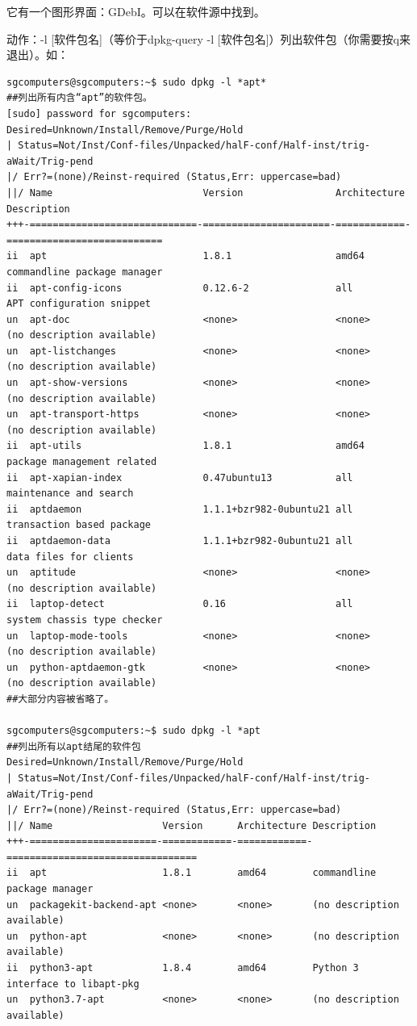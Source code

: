 \documentclass{book}
\begin{document}
它有一个图形界面：GDebI。可以在软件源中找到。\par
动作：-l [软件包名]（等价于dpkg-query -l [软件包名]）列出软件包（你需要按q来退出）。如：
\begin{verbatim}
sgcomputers@sgcomputers:~$ sudo dpkg -l *apt*
##列出所有内含“apt”的软件包。
[sudo] password for sgcomputers: 
Desired=Unknown/Install/Remove/Purge/Hold
| Status=Not/Inst/Conf-files/Unpacked/halF-conf/Half-inst/trig-aWait/Trig-pend
|/ Err?=(none)/Reinst-required (Status,Err: uppercase=bad)
||/ Name                          Version                Architecture Description
+++-=============================-======================-============-===========================
ii  apt                           1.8.1                  amd64        commandline package manager
ii  apt-config-icons              0.12.6-2               all          APT configuration snippet 
un  apt-doc                       <none>                 <none>       (no description available)
un  apt-listchanges               <none>                 <none>       (no description available)
un  apt-show-versions             <none>                 <none>       (no description available)
un  apt-transport-https           <none>                 <none>       (no description available)
ii  apt-utils                     1.8.1                  amd64        package management related 
ii  apt-xapian-index              0.47ubuntu13           all          maintenance and search 
ii  aptdaemon                     1.1.1+bzr982-0ubuntu21 all          transaction based package 
ii  aptdaemon-data                1.1.1+bzr982-0ubuntu21 all          data files for clients
un  aptitude                      <none>                 <none>       (no description available)
ii  laptop-detect                 0.16                   all          system chassis type checker
un  laptop-mode-tools             <none>                 <none>       (no description available)
un  python-aptdaemon-gtk          <none>                 <none>       (no description available)
##大部分内容被省略了。

sgcomputers@sgcomputers:~$ sudo dpkg -l *apt
##列出所有以apt结尾的软件包
Desired=Unknown/Install/Remove/Purge/Hold
| Status=Not/Inst/Conf-files/Unpacked/halF-conf/Half-inst/trig-aWait/Trig-pend
|/ Err?=(none)/Reinst-required (Status,Err: uppercase=bad)
||/ Name                   Version      Architecture Description
+++-======================-============-============-=================================
ii  apt                    1.8.1        amd64        commandline package manager
un  packagekit-backend-apt <none>       <none>       (no description available)
un  python-apt             <none>       <none>       (no description available)
ii  python3-apt            1.8.4        amd64        Python 3 interface to libapt-pkg
un  python3.7-apt          <none>       <none>       (no description available)


\end{verbatim}
\end{document}
